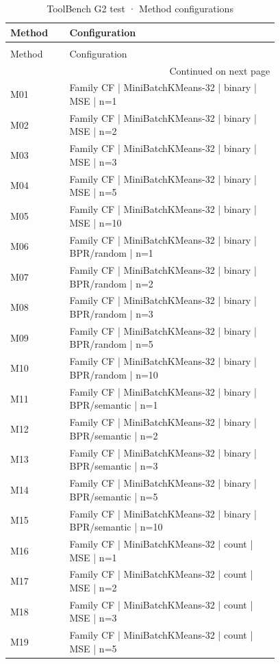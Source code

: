 \begin{longtable}{lp{0.78\linewidth}}
\caption{ToolBench G2 test · Method configurations} \label{tab:ToolBench-G2-test-family-family-methods} \\
\toprule
Method & Configuration \\
\midrule
\endfirsthead
\caption[]{ToolBench G2 test · Method configurations} \\
\toprule
Method & Configuration \\
\midrule
\endhead
\midrule
\multicolumn{2}{r}{Continued on next page} \\
\midrule
\endfoot
\bottomrule
\endlastfoot
M01 & Family CF | MiniBatchKMeans-32 | binary | MSE | n=1 \\
M02 & Family CF | MiniBatchKMeans-32 | binary | MSE | n=2 \\
M03 & Family CF | MiniBatchKMeans-32 | binary | MSE | n=3 \\
M04 & Family CF | MiniBatchKMeans-32 | binary | MSE | n=5 \\
M05 & Family CF | MiniBatchKMeans-32 | binary | MSE | n=10 \\
M06 & Family CF | MiniBatchKMeans-32 | binary | BPR/random | n=1 \\
M07 & Family CF | MiniBatchKMeans-32 | binary | BPR/random | n=2 \\
M08 & Family CF | MiniBatchKMeans-32 | binary | BPR/random | n=3 \\
M09 & Family CF | MiniBatchKMeans-32 | binary | BPR/random | n=5 \\
M10 & Family CF | MiniBatchKMeans-32 | binary | BPR/random | n=10 \\
M11 & Family CF | MiniBatchKMeans-32 | binary | BPR/semantic | n=1 \\
M12 & Family CF | MiniBatchKMeans-32 | binary | BPR/semantic | n=2 \\
M13 & Family CF | MiniBatchKMeans-32 | binary | BPR/semantic | n=3 \\
M14 & Family CF | MiniBatchKMeans-32 | binary | BPR/semantic | n=5 \\
M15 & Family CF | MiniBatchKMeans-32 | binary | BPR/semantic | n=10 \\
M16 & Family CF | MiniBatchKMeans-32 | count | MSE | n=1 \\
M17 & Family CF | MiniBatchKMeans-32 | count | MSE | n=2 \\
M18 & Family CF | MiniBatchKMeans-32 | count | MSE | n=3 \\
M19 & Family CF | MiniBatchKMeans-32 | count | MSE | n=5 \\

\end{longtable}
